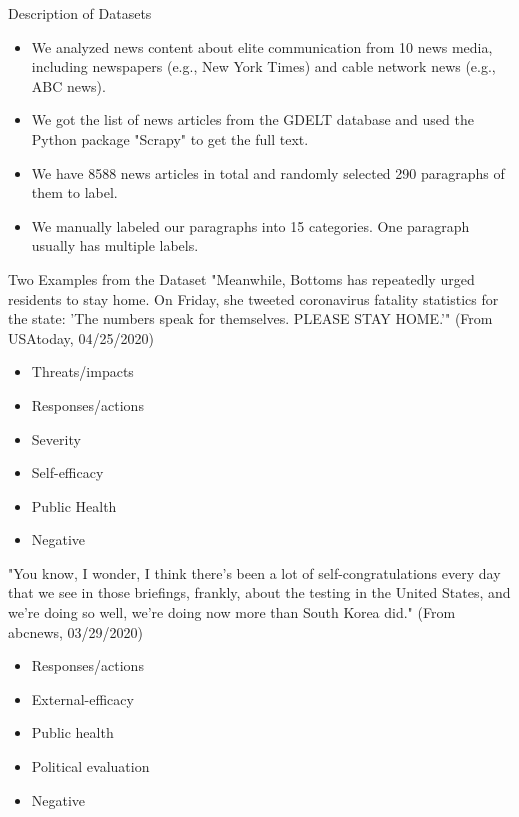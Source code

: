 \documentclass{beamer}
\begin{document}
\begin{frame}[t]{Description of Datasets}
    \small
    \begin{itemize}
        \item 
        We analyzed news content about elite communication from 10 news media, including newspapers (e.g., New York Times) and cable network news (e.g., ABC news).
        
        \item
        We got the list of news articles from the GDELT database and used the Python package "Scrapy" to get the full text.
        
        \item
        We have 8588 news articles in total and randomly selected 290 paragraphs of them to label. 
        
        \item
        We manually labeled our paragraphs into 15 categories. One paragraph usually has multiple labels.  
        
    \end{itemize}
    
\end{frame}

\begin{frame}[t]{Two Examples from the Dataset}
    \scriptsize
    "Meanwhile, Bottoms has repeatedly urged residents to stay home. On Friday, she tweeted coronavirus fatality statistics for the state: 'The numbers speak for themselves. PLEASE STAY HOME.'" (From USAtoday, 04/25/2020)
    \begin{itemize}
        \item 
        Threats/impacts
        \item
        Responses/actions
        \item
        Severity
        \item
        Self-efficacy
        \item
        Public Health
        \item
        Negative
    \end{itemize}
    "You know, I wonder, I think there's been a lot of self-congratulations every day that we see in those briefings, frankly, about the testing in the United States, and we're doing so well, we're doing now more than South Korea did." (From abcnews, 03/29/2020)
    \begin{itemize}
        \item 
        Responses/actions
        \item
        External-efficacy
        \item
        Public health
        \item
        Political evaluation
        \item
        Negative
    \end{itemize}
    
\end{frame}
\end{document}

